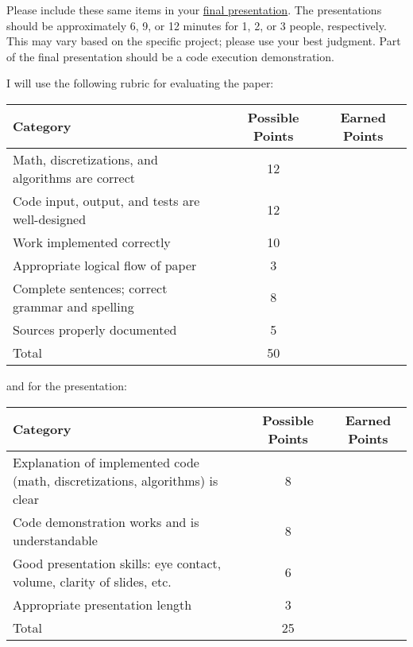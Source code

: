 \documentclass[a4paper, 12 pt]{curve}
\begin{document}
\vspace*{2em}
Please include these same items in your \underline{final presentation}. The presentations should be approximately 6, 9, or 12 minutes for 1, 2, or 3 people, respectively.  This may vary based on the specific project; please use your best judgment. Part of the final presentation should be a code execution demonstration.

\vspace*{2em}


\vspace*{2em}
I will use the following rubric for evaluating the paper:
\begin{center}
\begin{tabu}{| X | c | c |}\hline
\textbf{Category} & \textbf{Possible Points} & \textbf{Earned Points} \\ \hline \hline
Math, discretizations, and algorithms are correct & 12 & \\ \hline
Code input, output, and tests are well-designed & 12 & \\ \hline
Work implemented correctly & 10 & \\ \hline
Appropriate logical flow of paper & 3 & \\ \hline
Complete sentences; correct grammar and spelling & 8 & \\ \hline
Sources properly documented & 5 & \\ \hline
Total & 50 & \\\hline
\end{tabu} 
\end{center}

\vspace*{1 em}
and for the presentation:
\begin{center}
\begin{tabu}{| X | c | c |}\hline
\textbf{Category} & \textbf{Possible Points} & \textbf{Earned Points} \\ \hline \hline
Explanation of implemented code (math, discretizations, algorithms) is clear & 8 & \\ \hline
Code demonstration works and is understandable & 8 & \\ \hline
Good presentation skills: eye contact, volume, clarity of slides, etc. & 6 & \\ \hline
Appropriate presentation length & 3 & \\ \hline
Total & 25 & \\\hline
\end{tabu} 
\end{center}
\end{document}
